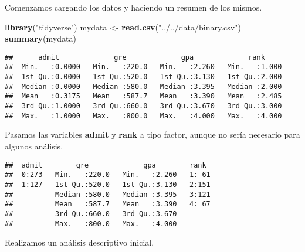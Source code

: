 \documentclass[
]{article}
\newenvironment{Shaded}{\begin{snugshade}}{\end{snugshade}}
\newcommand{\FunctionTok}[1]{\textcolor[rgb]{0.13,0.29,0.53}{\textbf{#1}}}
\newcommand{\NormalTok}[1]{#1}
\newcommand{\OtherTok}[1]{\textcolor[rgb]{0.56,0.35,0.01}{#1}}
\newcommand{\SpecialCharTok}[1]{\textcolor[rgb]{0.81,0.36,0.00}{\textbf{#1}}}
\newcommand{\StringTok}[1]{\textcolor[rgb]{0.31,0.60,0.02}{#1}}
\begin{document}
Comenzamos cargando los datos y haciendo un resumen de los mismos.

\begin{Shaded}
\begin{Highlighting}[]
\FunctionTok{library}\NormalTok{(}\StringTok{"tidyverse"}\NormalTok{)}
\NormalTok{mydata }\OtherTok{\textless{}{-}} \FunctionTok{read.csv}\NormalTok{(}\StringTok{"../../data/binary.csv"}\NormalTok{)}
\FunctionTok{summary}\NormalTok{(mydata)}
\end{Highlighting}
\end{Shaded}

\begin{verbatim}
##      admit             gre             gpa             rank      
##  Min.   :0.0000   Min.   :220.0   Min.   :2.260   Min.   :1.000  
##  1st Qu.:0.0000   1st Qu.:520.0   1st Qu.:3.130   1st Qu.:2.000  
##  Median :0.0000   Median :580.0   Median :3.395   Median :2.000  
##  Mean   :0.3175   Mean   :587.7   Mean   :3.390   Mean   :2.485  
##  3rd Qu.:1.0000   3rd Qu.:660.0   3rd Qu.:3.670   3rd Qu.:3.000  
##  Max.   :1.0000   Max.   :800.0   Max.   :4.000   Max.   :4.000
\end{verbatim}

Pasamos las variables \textbf{admit} y \textbf{rank} a tipo factor,
aunque no sería necesario para algunos análisis.

\begin{Shaded}
\end{Shaded}

\begin{verbatim}
##  admit        gre             gpa        rank   
##  0:273   Min.   :220.0   Min.   :2.260   1: 61  
##  1:127   1st Qu.:520.0   1st Qu.:3.130   2:151  
##          Median :580.0   Median :3.395   3:121  
##          Mean   :587.7   Mean   :3.390   4: 67  
##          3rd Qu.:660.0   3rd Qu.:3.670          
##          Max.   :800.0   Max.   :4.000
\end{verbatim}

Realizamos un análisis descriptivo inicial.
\end{document}
